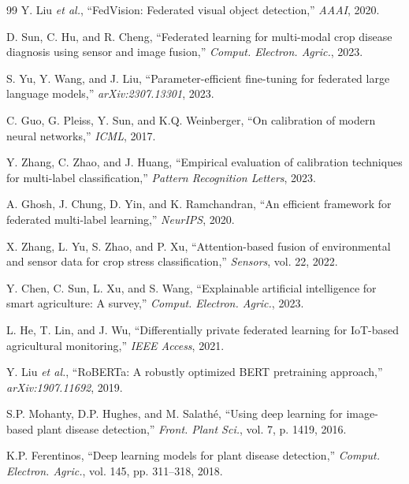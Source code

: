 \documentclass[10pt,journal,compsoc]{IEEEtran}
\begin{document}
\begin{thebibliography}{99}
Y. Liu \textit{et al.}, ``FedVision: Federated visual object detection,'' \textit{AAAI}, 2020.

D. Sun, C. Hu, and R. Cheng, ``Federated learning for multi-modal crop disease diagnosis using sensor and image fusion,'' \textit{Comput. Electron. Agric.}, 2023.

S. Yu, Y. Wang, and J. Liu, ``Parameter-efficient fine-tuning for federated large language models,'' \textit{arXiv:2307.13301}, 2023.

C. Guo, G. Pleiss, Y. Sun, and K.Q. Weinberger, ``On calibration of modern neural networks,'' \textit{ICML}, 2017.

Y. Zhang, C. Zhao, and J. Huang, ``Empirical evaluation of calibration techniques for multi-label classification,'' \textit{Pattern Recognition Letters}, 2023.

A. Ghosh, J. Chung, D. Yin, and K. Ramchandran, ``An efficient framework for federated multi-label learning,'' \textit{NeurIPS}, 2020.

X. Zhang, L. Yu, S. Zhao, and P. Xu, ``Attention-based fusion of environmental and sensor data for crop stress classification,'' \textit{Sensors}, vol. 22, 2022.

Y. Chen, C. Sun, L. Xu, and S. Wang, ``Explainable artificial intelligence for smart agriculture: A survey,'' \textit{Comput. Electron. Agric.}, 2023.

L. He, T. Lin, and J. Wu, ``Differentially private federated learning for IoT-based agricultural monitoring,'' \textit{IEEE Access}, 2021.

Y. Liu \textit{et al.}, ``RoBERTa: A robustly optimized BERT pretraining approach,'' \textit{arXiv:1907.11692}, 2019.

S.P. Mohanty, D.P. Hughes, and M. Salath{\'e}, ``Using deep learning for image-based plant disease detection,'' \textit{Front. Plant Sci.}, vol. 7, p. 1419, 2016.

K.P. Ferentinos, ``Deep learning models for plant disease detection,'' \textit{Comput. Electron. Agric.}, vol. 145, pp. 311--318, 2018.

\end{thebibliography}
\end{document}
